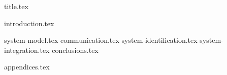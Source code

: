 \documentclass[final]{scrreprt} %
\begin{document}

{title.tex}

\newpage
{introduction.tex}
\newpage
\tableofcontents

\newpage
{}
{system-model.tex}
{communication.tex}
{system-identification.tex}
{system-integration.tex}
{conclusions.tex}
\newpage
{}

\printbibliography
{appendices.tex}
\end{document}
